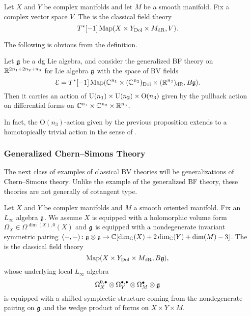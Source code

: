 \documentclass[10pt, oneside]{article}
\begin{document}
\begin{definition}
Let $X$ and $Y$ be complex manifolds and let $M$ be a smooth manifold. Fix a complex vector space $V$. The  is the classical field theory
\[T^*[-1]\operatorname{Map}(X\times Y_{\mathrm{Dol}}\times M_{\mathrm{dR}}, V).\]
\end{definition}

The following is obvious from the definition.

\begin{prop}
Let $\mathfrak g$ be a dg Lie algebra, and consider the generalized BF theory on $\mathbb R^{2n_1+2n_2+n_3}$ for Lie algebra $\mathfrak g$ with the space of BV fields
\[\mathcal E = T^*[-1]\operatorname{Map}(\mathbb C^{n_1}\times (\mathbb C^{n_2})_{\mathrm{Dol}}\times (\mathbb R^{n_3})_{\mathrm{dR}}, B\mathfrak g).\]
Then it carries an action of $\mathrm{U}(n_1)\times \mathrm{U}(n_2)\times \mathrm{O}(n_3)$ given by the pullback action on differential forms on $\mathbb C^{n_1}\times \mathbb C^{n_2}\times \mathbb R^{n_3}$.
\label{prop:BFrotationaction}
\end{prop}

\begin{remark}
In fact, the $\mathrm{O}(n_3)$-action given by the previous proposition extends to a homotopically trivial action in the sense of \cite[Section 2.4]{ElliottSafronov}.
\end{remark}

\subsubsection{Generalized Chern--Simons Theory} \label{gen_CS_section}
The next class of examples of classical BV theories will be generalizations of Chern--Simons theory. Unlike the example of the generalized BF theory, these theories are not generally of cotangent type.

\begin{definition}
Let $X$ and $Y$ be complex manifolds and $M$ a smooth oriented manifold. Fix an $L_\infty$ algebra $\mathfrak g$. We assume $X$ is equipped with a holomorphic volume form $\Omega_X \in\Omega^{\dim(X), 0}(X)$ and $\mathfrak g$ is equipped with a nondegenerate invariant symmetric pairing $\langle-, -\rangle\colon \mathfrak g\otimes\mathfrak g\rightarrow \mathbb C[\dim_\mathbb C(X) + 2\dim_\mathbb C(Y) + \dim(M) - 3]$. The  is the classical field theory
\[\operatorname{Map}(X\times Y_{\mathrm{Dol}}\times M_{\mathrm{dR}}, B\mathfrak g),\]
whose underlying local $L_\infty$ algebra
\[\Omega^{0,\bullet}_X \otimes \Omega^{\bullet,\bullet}_Y \otimes \Omega^\bullet_M \otimes \mathfrak g\]
is equipped with a shifted symplectic structure coming from the nondegenerate pairing on $\mathfrak g$ and the wedge product of forms on $X\times Y\times M$.
\label{def:generalizedCS}
\end{definition}
\end{document}

